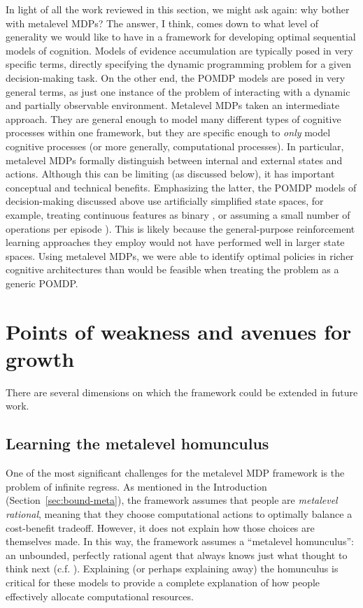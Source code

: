 In light of all the work reviewed in this section, we might ask again: why bother with metalevel MDPs? The answer, I think, comes down to what level of generality we would like to have in a framework for developing optimal sequential models of cognition. Models of evidence accumulation are typically posed in very specific terms, directly specifying the dynamic programming problem for a given decision-making task. On the other end, the POMDP models are posed in very general terms, as just one instance of the problem of interacting with a dynamic and partially observable environment. Metalevel MDPs taken an intermediate approach. They are general enough to model many different types of cognitive processes within one framework, but they are specific enough to \emph{only} model cognitive processes (or more generally, computational processes). In particular, metalevel MDPs formally distinguish between internal and external states and actions. Although this can be limiting (as discussed below), it has important conceptual and technical benefits. Emphasizing the latter, the POMDP models of decision-making discussed above use artificially simplified state spaces, for example, treating continuous features as binary \citep{chen2017cognitive}, or assuming a small number of operations per episode \citep{chen2021apparently}). This is likely because the general-purpose reinforcement learning approaches they employ would not have performed well in larger state spaces. Using metalevel MDPs, we were able to identify optimal policies in richer cognitive architectures than would be feasible when treating the problem as a generic POMDP.

\section{Points of weakness and avenues for growth}

There are several dimensions on which the framework could be extended in future work.

\subsection{Learning the metalevel homunculus}\label{sec:homunculus}

One of the most significant challenges for the metalevel MDP framework is the problem of infinite regress. As mentioned in the Introduction (Section~\ref{sec:bound-meta}), the framework assumes that people are \emph{metalevel rational}, meaning that they choose computational actions to optimally balance a cost-benefit tradeoff. However, it does not explain how those choices are themselves made. In this way, the framework assumes a ``metalevel homunculus'': an unbounded, perfectly rational agent that always knows just what thought to think next (c.f. \citealp{hazy2006banishing,botvinick2014computational}). Explaining (or perhaps explaining away) the homunculus is critical for these models to provide a complete explanation of how people effectively allocate computational resources.


